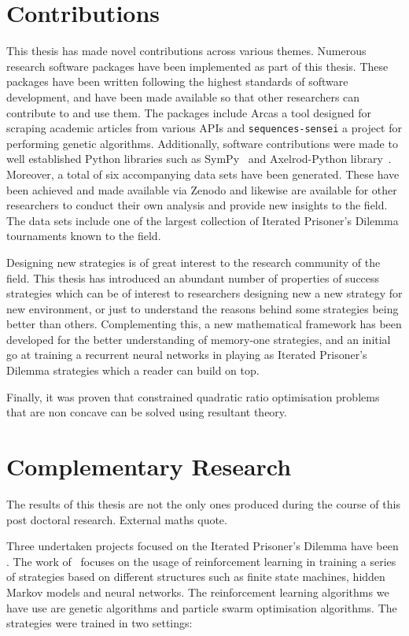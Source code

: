 \section{Contributions}

This thesis has made novel contributions across various themes. Numerous
research software packages have been implemented as part of this thesis. These
packages have been written following the highest standards of software
development, and have been made available so that other researchers can
contribute to and use them. The packages include Arcas a tool designed for
scraping academic articles from various APIs and
\texttt{sequences-sensei} a project for performing genetic
algorithms. Additionally, software contributions were made to well established
Python libraries such as SymPy~\cite{sympy} and Axelrod-Python
library~\cite{axelrodproject}. Moreover, a total of six accompanying data sets
have been generated. These have been achieved and made available via Zenodo and
likewise are available for other researchers to conduct their own analysis and
provide new insights to the field. The data sets include one of the largest
collection of Iterated Prisoner's Dilemma tournaments known to the field.

Designing new strategies is of great interest to the research community of the
field. This thesis has introduced an abundant number of properties of success
strategies which can be of interest to researchers designing new a new strategy
for new environment, or just to understand the reasons behind some strategies
being better than others. Complementing this, a new mathematical framework has
been developed for the better understanding of memory-one strategies, and an
initial go at training a recurrent neural networks in playing as Iterated
Prisoner's Dilemma strategies which a reader can build on top.

Finally, it was proven that constrained quadratic ratio optimisation problems
that are non concave can be solved using resultant theory.

\section{Complementary Research}

The results of this thesis are not the only ones produced during the course of
this post doctoral research. External maths quote.

Three undertaken projects focused on the Iterated Prisoner's Dilemma have been
\cite{Knight2019, Knight2017, Harper2017}. The work of~\cite{Knight2017, Harper2017}
focuses on the usage of reinforcement learning in training a series of
strategies based on different structures such as finite state machines, hidden
Markov models and neural networks. The reinforcement learning algorithms we have
use are genetic algorithms and particle swarm optimisation algorithms. The
strategies were trained in two settings:


